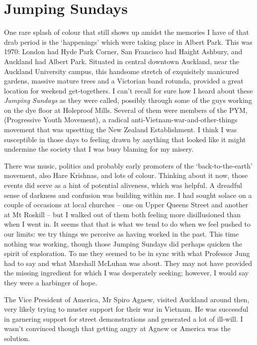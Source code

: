 \chapter{Jumping Sundays}

One rare splash of colour that still shows up amidst the memories I have
of that drab period is the `happenings' which were taking place in
Albert Park. This was 1970: London had Hyde Park Corner, San Francisco
had Haight Ashbury, and Auckland had Albert Park. Situated in central
downtown Auckland, near the Auckland
University campus, this handsome stretch of exquisitely manicured
gardens, massive mature trees and a Victorian band rotunda, provided a
great location for weekend get-togethers. I can't recall for sure how I heard
about these \emph{Jumping Sundays} as they were called, possibly through
some of the guys working on the dye floor at Holeproof Mills. Several of
them were members of the PYM, (Progressive Youth Movement)\cite{pym}, a radical
anti-Vietnam-war-and-other-things movement that was upsetting the New
Zealand Establishment. I think I was susceptible in those days to
feeling drawn by anything that looked like it might undermine the
society that I was busy blaming for my misery.

There was music, politics and probably early promoters of the
`back-to-the-earth' movement, also Hare Krishnas, and lots of
colour. Thinking about it now, those events did serve as a hint of
potential aliveness, which was helpful. A dreadful sense of darkness and
confusion was building within me. I had sought solace on a couple of
occasions at local churches -- one on Upper Queens Street and another
at Mt Roskill -- but I walked out of them both feeling more
disillusioned than when I went in. It seems that that is what we tend to
do when we feel pushed to our limits: we try things we perceive as
having worked in the past. This time nothing was working, though those
Jumping Sundays did perhaps quicken the spirit of exploration. To me
they seemed to be in sync with what Professor Jung had to say and what
Marshall McLuhan was about. They may not have provided the missing
ingredient for which I was desperately seeking; however, I would say
they were a harbinger of hope.

The Vice President of America, Mr Spiro Agnew, visited Auckland around
then, very likely trying to muster support for their war in Vietnam. He
was successful in garnering support for street demonstrations and
generated a lot of ill-will. I wasn't convinced though that getting
angry at Agnew or America was the solution.

